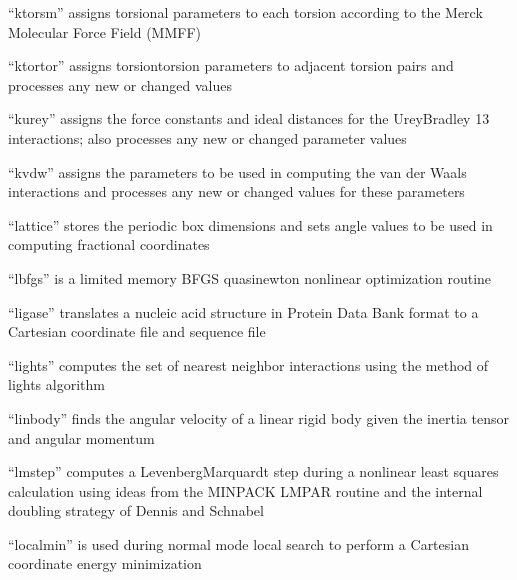 \documentclass[letterpaper,11pt,english]{sphinxmanual}
\begin{document}

“ktorsm” assigns torsional parameters to each torsion according
to the Merck Molecular Force Field (MMFF)


“ktortor” assigns torsion\sphinxhyphen{}torsion parameters to adjacent
torsion pairs and processes any new or changed values


“kurey” assigns the force constants and ideal distances
for the Urey\sphinxhyphen{}Bradley 1\sphinxhyphen{}3 interactions; also processes any
new or changed parameter values


“kvdw” assigns the parameters to be used in computing the
van der Waals interactions and processes any new or changed
values for these parameters


“lattice” stores the periodic box dimensions and sets angle
values to be used in computing fractional coordinates


“lbfgs” is a limited memory BFGS quasi\sphinxhyphen{}newton nonlinear
optimization routine


“ligase” translates a nucleic acid structure in Protein Data
Bank format to a Cartesian coordinate file and sequence file


“lights” computes the set of nearest neighbor interactions
using the method of lights algorithm


“linbody” finds the angular velocity of a linear rigid body
given the inertia tensor and angular momentum


“lmstep” computes a Levenberg\sphinxhyphen{}Marquardt step during a nonlinear
least squares calculation using ideas from the MINPACK LMPAR
routine and the internal doubling strategy of Dennis and Schnabel


“localmin” is used during normal mode local search to
perform a Cartesian coordinate energy minimization
\end{document}
